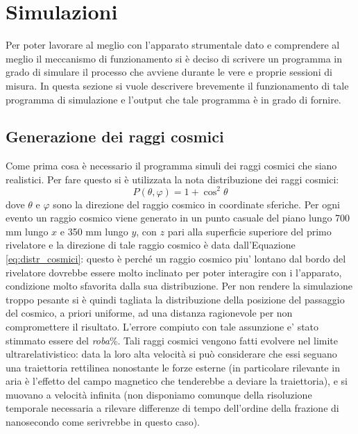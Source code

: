 \section{Simulazioni}
Per poter lavorare al meglio con l'apparato strumentale dato e comprendere al meglio il meccanismo di funzionamento si è deciso di scrivere un programma in grado di simulare
il processo che avviene durante le vere e proprie sessioni di misura. In questa sezione si vuole descrivere brevemente il funzionamento di tale programma di simulazione e
l'output che tale programma è in grado di fornire.
\subsection{Generazione dei raggi cosmici}
Come prima cosa è necessario il programma simuli dei raggi cosmici che siano realistici. Per fare questo si è utilizzata la nota distribuzione dei raggi cosmici:
\begin{equation}
	P\left(\theta, \varphi\right) = 1+\cos^2{\theta}
	\label{eq:distr_cosmici}
\end{equation}
dove $\theta$ e $\varphi$ sono la direzione del raggio cosmico in coordinate sferiche.
Per ogni evento un raggio cosmico viene generato in un punto casuale del piano lungo 700 mm lungo $x$ e 350 mm lungo $y$, con $z$ pari alla superficie superiore del primo rivelatore e la direzione di tale raggio cosmico è data dall'Equazione \ref{eq:distr_cosmici}: questo \`e perch\'e un raggio cosmico piu' lontano dal bordo del rivelatore dovrebbe essere molto inclinato per poter interagire con i l'apparato, condizione molto sfavorita dalla sua distribuzione. Per non rendere la simulazione troppo pesante si \`e quindi tagliata la distribuzione della posizione del passaggio del cosmico, a priori uniforme, ad una distanza ragionevole per non compromettere il risultato. L'errore compiuto con tale assunzione e' stato stimmato essere del \textit{roba}\%.
Tali raggi cosmici vengono fatti evolvere nel limite ultrarelativistico: data la loro alta velocità si può considerare che essi seguano una traiettoria rettilinea nonostante
le forze esterne (in particolare rilevante in aria è l'effetto del campo magnetico che tenderebbe a deviare la traiettoria), e si muovano a velocità infinita (non disponiamo comunque della risoluzione temporale necessaria a rilevare differenze di tempo dell'ordine della frazione di nanosecondo come serivrebbe in questo caso).

